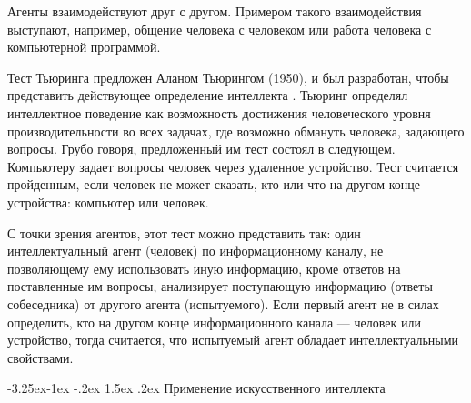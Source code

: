 \documentclass[12pt, openany, twoside]{book} %
\makeatletter
\renewcommand\subsection{\@startsection{subsection}{2}{\z@}%
                                     {-3.25ex\@plus -1ex \@minus -.2ex}%
                                     {1.5ex \@plus .2ex}%
                                     {\normalfont\normalsize\bfseries}}
\makeatother
\begin{document}
Агенты взаимодействуют друг с другом. Примером такого взаимодействия выступают, например, общение человека с человеком или работа человека с компьютерной программой.

Тест Тьюринга предложен Аланом Тьюрингом (1950), и был разработан, чтобы представить действующее определение интеллекта \cite{Russell}. Тьюринг определял интеллектное поведение как возможность достижения человеческого уровня производительности во всех задачах, где возможно обмануть человека, задающего вопросы. Грубо говоря, предложенный им тест состоял в следующем. Компьютеру задает вопросы человек через удаленное устройство. Тест считается пройденным, если человек не может сказать, кто или что на другом конце устройства: компьютер или человек.

С точки зрения агентов, этот тест можно представить так: один интеллектуальный агент (человек) по информационному каналу, не позволяющему ему использовать иную информацию, кроме ответов на поставленные им вопросы, анализирует поступающую информацию (ответы собеседника) от другого агента (испытуемого). Если первый агент не в силах определить, кто на другом конце информационного канала --- человек или устройство, тогда считается, что испытуемый агент обладает интеллектуальными свойствами.

\subsection{Применение искусственного интеллекта}
\end{document}
